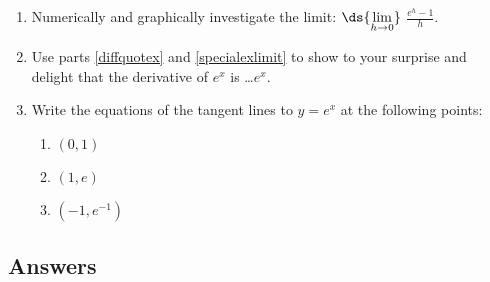 \documentclass{ximera}
\begin{document}
\begin{enumerate}
\begin{enumerate}
\item\label{specialexlimit}    Numerically and graphically investigate the limit: $\ds{\lim_{h \rightarrow 0}}$ $\frac{e^{h} - 1}{h}$.

\item  Use parts \ref{diffquotex} and \ref{specialexlimit} to show to your surprise and delight that the derivative of $e^{x}$ is \ldots  $e^{x}$.

\item  Write the equations of the tangent lines to $y = e^{x}$ at the following points:

\begin{enumerate}

\item  $(0,1)$

\item  $(1, e)$

\item $\left(-1, e^{-1} \right)$

\end{enumerate}

\end{enumerate}

\setcounter{HW}{\value{enumi}}
\end{enumerate}


\newpage

\subsection{Answers}
\end{document}
